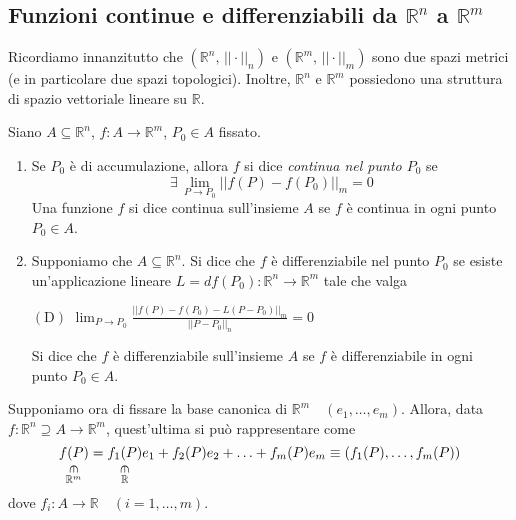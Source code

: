 \subsection{Funzioni continue e differenziabili da $\mathbb{R}^n$ a $\mathbb{R}^m$}
Ricordiamo innanzitutto che $(\mathbb{R}^n,\,||\cdot||_n)$ e $(\mathbb{R}^m,\,||\cdot||_m)$ sono due spazi metrici (e in particolare due spazi topologici). Inoltre, $\mathbb{R}^n$ e $\mathbb{R}^m$ possiedono una struttura di spazio vettoriale lineare su $\mathbb{R}$.

\begin{definition}
Siano $A \subseteq \mathbb{R}^n$, $f : A \longrightarrow \mathbb{R}^m$, $P_0 \in A$ fissato.
\begin{enumerate}[labelindent=\parindent,leftmargin=*,label=\textnormal{(\roman*)},start=1]
\item Se $P_0$ è di accumulazione, allora $f$ si dice \emph{continua nel punto $P_0$} se
$$\exists \, \lim_{P \rightarrow P_0} ||f(P) - f(P_0)||_m = 0$$
Una funzione $f$ si dice continua sull'insieme $A$ se $f$ è continua in ogni punto $P_0 \in A$.
\item Supponiamo che $A \subseteq \mathbb{R}^n$. Si dice che $f$ è differenziabile nel punto $P_0$ se esiste un'applicazione lineare $L=df(P_0) : \mathbb{R}^n \longrightarrow \mathbb{R}^m$ tale che valga
\begin{center}
$\mathrm{(D)}$
\hfill
$\displaystyle \lim_{P \rightarrow P_0} \frac{||f(P)-f(P_0)-L(P-P_0)||_m}{||P-P_0||_n} = 0$
\hfill \null \\
\end{center}
Si dice che $f$ è differenziabile sull'insieme $A$ se $f$ è differenziabile in ogni punto $P_0 \in A$.
\end{enumerate}
\end{definition}

Supponiamo ora di fissare la base canonica di $\mathbb{R}^m \quad (e_1,\ldots,e_m)$. Allora, data $f : \mathbb{R}^n \supseteq A \longrightarrow \mathbb{R}^m$, quest'ultima si può rappresentare come
$$
\underset{\overset{\rotatebox{270}{$\in$}}{\mathbb{R}^m}}{f(P)} = \underset{\overset{\rotatebox{270}{$\in$}}{\mathbb{R}}}{f_1(P)}e_1 + f_2(P)e_2 + \ldots + f_m(P)e_m \equiv (f_1(P),\ldots,f_m(P))
$$
dove $f_i : A \longrightarrow \mathbb{R} \quad (i=1,\ldots,m)$.

